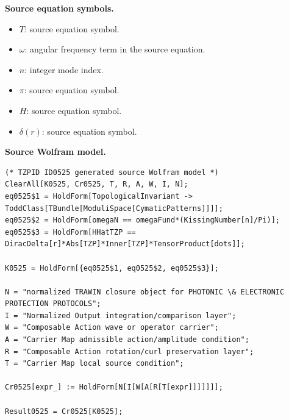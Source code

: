 \begin{minipage}[t]{0.49\linewidth}
\begingroup
\small
\raggedright
\textbf{Source equation symbols.}\par
\begin{itemize}[leftmargin=1.35em,itemsep=1pt,topsep=1pt,parsep=0pt]
    \item $T$: source equation symbol.
    \item $\omega$: angular frequency term in the source equation.
    \item $n$: integer mode index.
    \item $\pi$: source equation symbol.
    \item $H$: source equation symbol.
    \item $\delta(r)$: source equation symbol.
\end{itemize}
\endgroup
\end{minipage}\hfill
\begin{minipage}[t]{0.47\linewidth}
\begingroup
\scriptsize
\raggedright
\textbf{Source Wolfram model.}\par
\begin{Verbatim}[fontsize=\tiny,breaklines=true,breakanywhere=true]
(* TZPID ID0525 generated source Wolfram model *)
ClearAll[K0525, Cr0525, T, R, A, W, I, N];
eq0525$1 = HoldForm[TopologicalInvariant -> ToddClass[TBundle[ModuliSpace[CymaticPatterns]]]];
eq0525$2 = HoldForm[omegaN == omegaFund*(KissingNumber[n]/Pi)];
eq0525$3 = HoldForm[HHatTZP == DiracDelta[r]*Abs[TZP]*Inner[TZP]*TensorProduct[dots]];

K0525 = HoldForm[{eq0525$1, eq0525$2, eq0525$3}];

N = "normalized TRAWIN closure object for PHOTONIC \& ELECTRONIC PROTECTION PROTOCOLS";
I = "Normalized Output integration/comparison layer";
W = "Composable Action wave or operator carrier";
A = "Carrier Map admissible action/amplitude condition";
R = "Composable Action rotation/curl preservation layer";
T = "Carrier Map local source condition";

Cr0525[expr_] := HoldForm[N[I[W[A[R[T[expr]]]]]]];

Result0525 = Cr0525[K0525];
\end{Verbatim}
\endgroup
\end{minipage}

